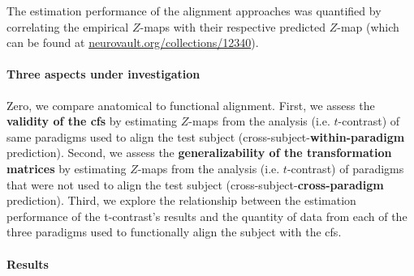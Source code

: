 %
The estimation performance of the alignment approaches was quantified by
correlating the empirical $Z$-maps with their respective predicted $Z$-map
(which can be found at
\href{https://identifiers.org/neurovault.collection:12340}{\url{neurovault.org/collections/12340}}).


\paragraph{Three aspects under investigation}





%
Zero, we compare anatomical to functional alignment.
%
First, we assess the \textbf{validity of the \ac{cfs}} by estimating $Z$-maps
from the analysis (i.e. $t$-contrast) of same paradigms used to align the test
subject (cross-subject-\textbf{within-paradigm} prediction).
%
Second, we assess the \textbf{generalizability of the transformation matrices}
by estimating $Z$-maps from the analysis (i.e. $t$-contrast) of paradigms that
were not used to align the test subject (cross-subject-\textbf{cross-paradigm}
prediction).
%
Third, we explore the relationship between the estimation performance of the
t-contrast's results and the quantity of data from each of the three paradigms
used to functionally align the subject with the \ac{cfs}.


\paragraph{Results}


